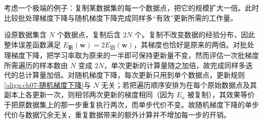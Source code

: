 \documentclass[../../main.tex]{subfiles}
\begin{document}
\begin{center}
\setlength{\fboxsep}{7pt}%
\end{center}

\begin{example}[ 数据冗余下的计算量对比]\label{example:ch07-数据冗余}
考虑一个极端的例子：复制某数据集的每一个数据点，把它的规模扩大一倍。此时比较批处理梯度下降与随机梯度下降完成同样多“有效”更新所需的工作量。
\end{example}
\begin{solution}
设原数据集含 $N$ 个数据点，复制后含 $2N$ 个。复制不改变数据的经验分布，因此整体误差函数满足 $E_{\text{新}}(\mathbf{w})=2E_{\text{旧}}(\mathbf{w})$，其梯度也恰好是原来的两倍。对批处理梯度下降，把学习率取为原来的一半即可保持更新量不变，然而评估一次批梯度所需遍历的样本数由 $N$ 变成 $2N$，单次更新的计算量随之加倍，故完成同样多迭代的总计算量加倍。对随机梯度下降，每次更新只用到单个数据点，更新规则\eqref{align:ch07-随机梯度下降}与 $N$ 无关；若把遍历顺序安排为在每个原始数据点及其副本上各更新一次，则相邻两次更新的梯度相同（因为 $E_n$ 被复制），其效果等价于把原数据集上的那一步重复执行两次，而单步代价不变。故随机梯度下降的单步代价与数据冗余无关，重复数据带来的额外计算并不增加每一步的开销。
\end{solution}
\end{document}
